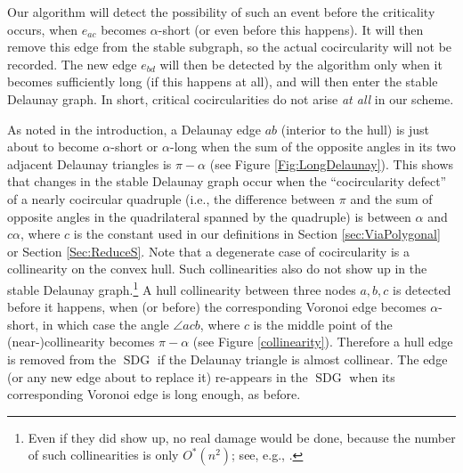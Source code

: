 \documentclass[letter,11pt]{article}
\def\SDG{\mathop{\mathrm{SDG}}}
\begin{document}
Our algorithm will detect the possibility of such an event before the criticality occurs,
when $e_{ac}$ becomes $\alpha$-short (or even before this happens). It will then remove this edge from the stable subgraph,
so the actual cocircularity will not be recorded. The new edge $e_{bd}$
will then be detected by the algorithm only when it becomes sufficiently long
(if this happens at all), and will then enter the stable Delaunay graph. In short,
critical cocircularities do not arise {\em at all} in our scheme.

As noted in the introduction, a Delaunay edge $ab$ (interior to the hull) is just about to become $\alpha$-short or $\alpha$-long when the sum of the opposite angles in its two adjacent Delaunay triangles is $\pi-\alpha$ (see Figure \ref{Fig:LongDelaunay}). This shows that changes in the stable Delaunay graph occur when the
``cocircularity defect'' of a nearly cocircular quadruple (i.e., the difference between $\pi$ and the sum of opposite angles in the quadrilateral spanned by the quadruple) is between
$\alpha$ and $c\alpha$, where $c$ is the constant used in our definitions in Section \ref{sec:ViaPolygonal} or Section \ref{Sec:ReduceS}.
Note that a degenerate case of cocircularity is a collinearity on the convex
hull.
Such collinearities also do not show up in the stable
Delaunay graph.\footnote{Even if they did show up, no real damage would be done, because the number of such collinearities is only $O^*(n^2)$; see, e.g., \cite{SA95}.} A hull collinearity between three nodes $a, b, c$ is
detected before it happens, when (or before) the corresponding Voronoi edge
becomes $\alpha$-short, in which case the angle $\angle acb$, where $c$ is the middle point of the (near-)collinearity becomes $\pi-\alpha$ (see Figure \ref{collinearity}). 
Therefore a hull edge is removed from the $\SDG$ if the Delaunay triangle is
almost collinear. The edge (or any new edge about to replace it) re-appears in the $\SDG$ when its corresponding
Voronoi edge is long enough, as before. 
\end{document}
